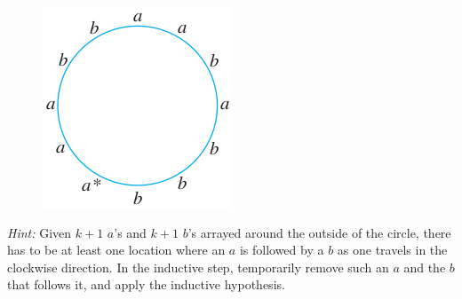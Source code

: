 \documentclass[14pt]{extarticle}
\begin{document}
\begin{figure}[ht!]
\centering
\includegraphics[scale=0.5]{../images/5.3.38.png}
\end{figure}

{\it Hint:} Given $k + 1$ $a$’s and $k + 1$ $b$’s arrayed around the outside of the circle, there has to be at least one location where an $a$ is followed by a $b$ as one travels in the clockwise direction. In the inductive step, temporarily remove such an $a$ and the $b$ that follows it, and apply the inductive hypothesis.
\end{document}
